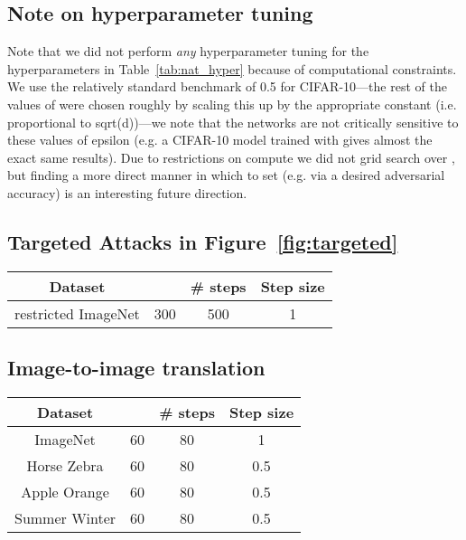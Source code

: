 \documentclass{article}
\newcommand{\HtoZ}{Horse  Zebra}
\newcommand{\StoW}{Summer  Winter}
\newcommand{\AtoO}{Apple  Orange}
\begin{document}
{\subsection{Note on hyperparameter tuning}
\label{app:tune}
Note that we did not perform \emph{any} hyperparameter tuning 
for the hyperparameters in Table~\ref{tab:nat_hyper} because of 
computational constraints. We use the relatively standard benchmark 
 of 0.5 for CIFAR-10---the rest of the values of  were chosen 
roughly by scaling this up by the appropriate constant (i.e. proportional
to sqrt(d))---we note that the networks are not critically sensitive to 
these values of epsilon (e.g. a CIFAR-10 model trained with  
gives almost the exact same results). Due to restrictions on compute we 
did not grid search over , but finding a more direct manner 
in which to set  (e.g. via a desired adversarial accuracy) is an 
interesting future direction.

\subsection{Targeted Attacks in Figure~\ref{fig:targeted}}

\begin{center}
\setlength{\tabcolsep}{.8cm}
\begin{tabular}{cccc}
\toprule 
Dataset &  & \# steps & Step size \\
\midrule
restricted ImageNet & 300 & 500 & 1 \\
\bottomrule 
\end{tabular}
\end{center}

\subsection{Image-to-image translation}

\begin{center}
\setlength{\tabcolsep}{.8cm}
\begin{tabular}{cccc}
\toprule 
Dataset &  & \# steps & Step size \\
\midrule
ImageNet & 60 & 80 & 1 \\
{\HtoZ} & 60 & 80 & 0.5 \\
{\AtoO} & 60 & 80 & 0.5 \\
{\StoW} & 60 & 80 & 0.5 \\
\bottomrule 
\end{tabular}
\end{center}

}
\end{document}
